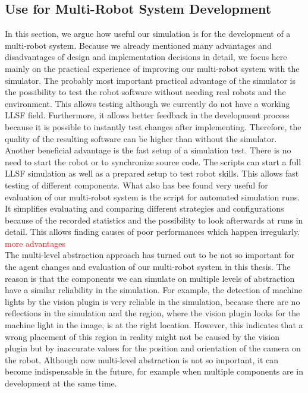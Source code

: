 \subsection{Use for Multi-Robot System Development}
In this section, we argue how useful our simulation is for the development of a multi-robot system. Because we already mentioned many advantages and disadvantages of design and implementation decisions in detail, we focus here mainly on the practical experience of improving our multi-robot system with the simulator. 
The probably most important practical advantage of the simulator is the possibility to test the robot software without needing real robots and the environment. This allows testing although we currently do not have a working LLSF field. Furthermore, it allows better feedback in the development process because it is possible to instantly test changes after implementing. Therefore, the quality of the resulting software can be higher than without the simulator. Another beneficial advantage is the fast setup of a simulation test. There is no need to start the robot or to synchronize source code. The scripts can start a full LLSF simulation as well as a prepared setup to test robot skills. This allows fast testing of different components.
What also has bee found very useful for evaluation of our multi-robot system is the script for automated simulation runs. It simplifies evaluating and comparing different strategies and configurations because of the recorded statistics and the possibility to look afterwards at runs in detail. This allows finding causes of poor performances which happen irregularly.
\textcolor{red}{more advantages}\\
The multi-level abstraction approach has turned out to be not so important for the agent changes and evaluation of our multi-robot system in this thesis. The reason is that the components we can simulate on multiple levels of abstraction have a similar reliability in the simulation. For example, the detection of machine lights by the vision plugin is very reliable in the simulation, because there are no reflections in the simulation and the region, where the vision plugin looks for the machine light in the image, is at the right location. However, this indicates that a wrong placement of this region in reality might not be caused by the vision plugin but by inaccurate values for the position and orientation of the camera on the robot. Although now multi-level abstraction is not so important, it can become indispensable in the future, for example when multiple components are in development at the same time.\\
